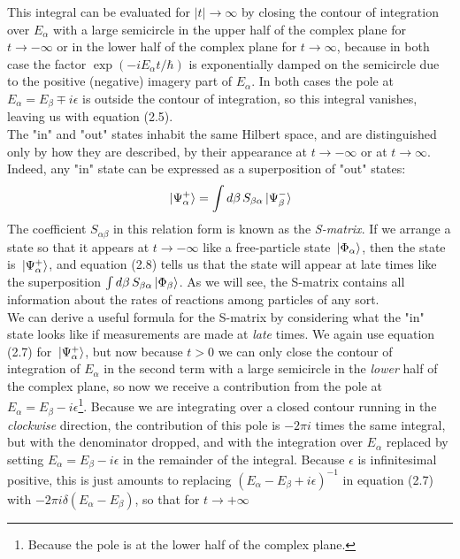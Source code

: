 \documentclass[12pt]{article}
\numberwithin{equation}{section}
\begin{document}
This integral can be evaluated for $|t|\rightarrow\infty$ by closing the contour of integration over $E_{\alpha}$ with a large semicircle in the upper half of the complex plane for $t\rightarrow-\infty$ or in the lower half of the complex plane for $t\rightarrow\infty$, because in both case the factor $\exp(-iE_{\alpha}t/\hbar)$ is exponentially damped on the semicircle due to the positive (negative) imagery part of $E_{\alpha}$.
In both cases the pole at $E_{\alpha} = E_{\beta}\mp i\epsilon$ is outside the contour of integration, so this integral vanishes, leaving us with equation (2.5).
\\\indent The "in" and "out" states inhabit the same Hilbert space, and are distinguished only by how they are described, by their appearance at $t\rightarrow-\infty$ or at $t\rightarrow\infty$.
Indeed, any "in" state can be expressed as a superposition of "out" states:
\begin{equation}
    \ket*{\Psi_{\alpha}^{+}} = \int{d\beta\, S_{\beta\alpha}\ket*{\Psi_{\beta}^{-}}}
\end{equation}
The coefficient $S_{\alpha\beta}$ in this relation form is known as the \textit{S-matrix}.
If we  arrange a state so that it appears at $t\rightarrow-\infty$ like a free-particle state $\ket*{\Phi_{\alpha}}$, then the state is $\ket*{\Psi_{\alpha}^{+}}$, and equation (2.8) tells us that the state will appear at late times like the superposition $\int{d\beta\,S_{\beta\alpha}\ket*{\Phi_{\beta}}}$.
As we will see, the S-matrix contains all information about the rates of reactions among particles of any sort.
\\\indent We can derive a useful formula for the S-matrix by considering what the "in" state looks like if measurements are made at \textit{late} times.
We again use equation (2.7) for $\ket*{\Psi_{\alpha}^{+}}$, but now because $t>0$ we can only close the contour of integration of $E_{\alpha}$ in the second term with a large semicircle in the \textit{lower} half of the complex plane, so now we receive a contribution from the pole at $E_{\alpha} = E_{\beta}-i\epsilon$\footnote{Because the pole is at the lower half of the complex plane.}.
Because we are integrating over a closed contour running in the \textit{clockwise} direction, the contribution of this pole is $-2\pi i$ times the same integral, but with the denominator dropped, and with the integration over $E_{\alpha}$ replaced by setting $E_{\alpha} = E_{\beta} - i\epsilon$ in the remainder of the integral. 
Because $\epsilon$ is infinitesimal positive, this is just amounts to replacing $\left(E_{\alpha}-E_{\beta}+i\epsilon\right)^{-1}$ in equation (2.7) with $-2\pi i\delta(E_{\alpha}-E_{\beta})$, so that for $t\rightarrow+\infty$
\end{document}
